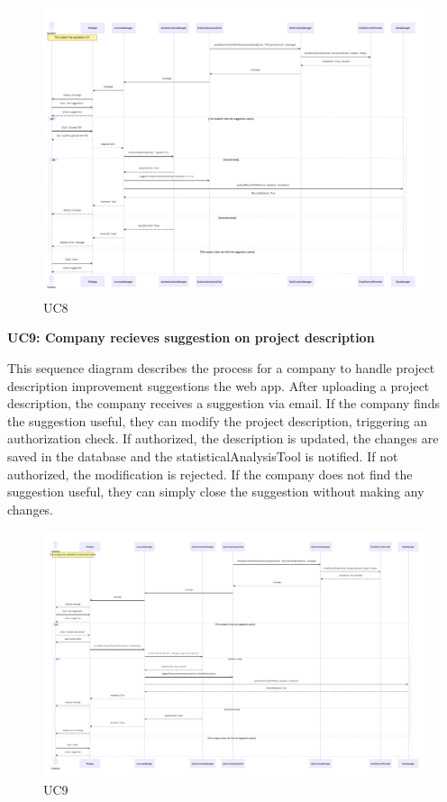 \begin{figure}[H]
    \centering
    \hspace{-1 cm} %
    \includegraphics[width=1.1\linewidth]{DD//Images/SequenceDiagrams/UC8.pdf}
    \caption{UC8}
\end{figure}

\newpage
\textbf{UC9: Company recieves suggestion on project description}

This sequence diagram describes the process for a company to handle project description improvement suggestions the web app. After uploading a project description, the company receives a suggestion via email. If the company finds the suggestion useful, they can modify the project description, triggering an authorization check. If authorized, the description is updated, the changes are saved in the database and the statisticalAnalysisTool is notified. If not authorized, the modification is rejected. If the company does not find the suggestion useful, they can simply close the suggestion without making any changes.

\begin{figure}[H]
    \centering
    \hspace{-1 cm} %
    \includegraphics[width=1.1\linewidth]{DD//Images/SequenceDiagrams/UC9.pdf}
    \caption{UC9}
\end{figure}

